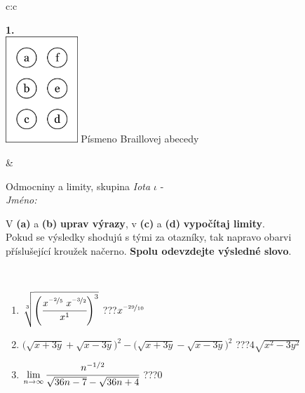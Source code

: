\documentclass[10pt]{report}
\begin{document}
\begin{tabular}{c:c}
\begin{minipage}[c][104.5mm][t]{0.5\linewidth}
\begin{center}
\begin{minipage}{0.20\linewidth}
\begin{center}
{\Huge\bfseries 1.} \\[2mm]
\includegraphics[height=40mm]{../images/braille.png}
{\small Písmeno Braillovej abecedy}
\end{center}
\end{minipage}
\end{center}
\end{minipage}
&
\begin{minipage}[c][104.5mm][t]{0.5\linewidth}
\begin{center}
\vspace{7mm}
{\huge Odmocniny a limity, skupina \textit{Iota $\iota$} -}\\[5mm]
\textit{Jméno:}\phantom{xxxxxxxxxxxxxxxxxxxxxxxxxxxxxxxxxxxxxxxxxxxxxxxxxxxxxxxxxxxxxxxxx}\\[5mm]
\begin{minipage}{0.95\linewidth}
\begin{center}
V \textbf{(a)} a \textbf{(b)} \textbf{uprav výrazy}, v \textbf{(c)} a \textbf{(d)} \textbf{vypočítaj limity}.\\Pokud se výsledky shodujú s tými za otazníky, tak napravo obarvi\\příslušející kroužek načerno. \textbf{Spolu odevzdejte výsledné slovo}.
\end{center}
\end{minipage}
\\[1mm]
\begin{minipage}{0.79\linewidth}
\begin{center}
\begin{varwidth}{\linewidth}
\begin{enumerate}
\small
\item $\sqrt[3]{\left(\cfrac{x^{\nicefrac{-2}{5}}\;x^{\nicefrac{-3}{2}}}{x^{1}}\right)^{3}}$\quad \dotfill\; ???\;\dotfill \quad $x^{\nicefrac{-29}{10}}$
\item {\footnotesize{\scriptsize$\big(\sqrt{x+3y}+\sqrt{x-3y}\big)^2-\big(\sqrt{x+3y}-\sqrt{x-3y}\big)^2$}\quad \dotfill\; ???\;\dotfill \quad $4\sqrt{x^2-3y^2}$}
\item $\lim\limits_{n\to\infty}\cfrac{n^{-1/2}}{\sqrt{36n-7}-\sqrt{36n+4}}$\quad \dotfill\; ???\;\dotfill \quad $0$

\end{enumerate}
\end{varwidth}
\end{center}
\end{minipage}
\end{center}
\end{minipage}
\end{tabular}
\end{document}
